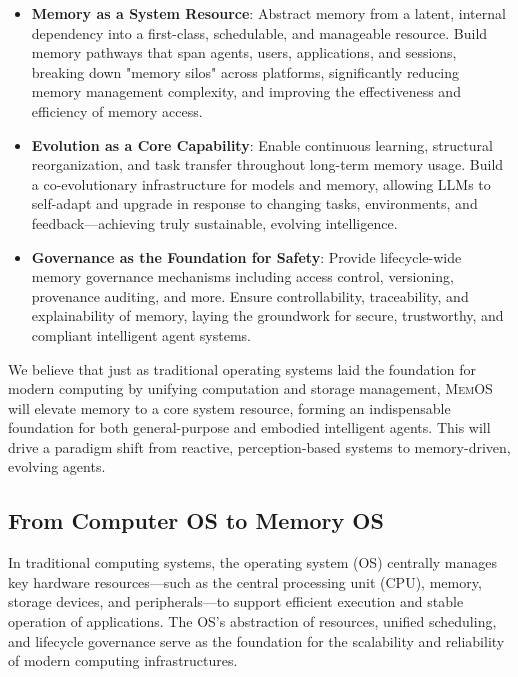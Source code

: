 \documentclass[]{memtensor}
\begin{document}
\begin{itemize}
    \item \textbf{Memory as a System Resource}: Abstract memory from a latent, internal dependency into a first-class, schedulable, and manageable resource. Build memory pathways that span agents, users, applications, and sessions, breaking down "memory silos" across platforms, significantly reducing memory management complexity, and improving the effectiveness and efficiency of memory access.

    \item \textbf{Evolution as a Core Capability}: Enable continuous learning, structural reorganization, and task transfer throughout long-term memory usage. Build a co-evolutionary infrastructure for models and memory, allowing LLMs to self-adapt and upgrade in response to changing tasks, environments, and feedback—achieving truly sustainable, evolving intelligence.

    \item \textbf{Governance as the Foundation for Safety}: Provide lifecycle-wide memory governance mechanisms including access control, versioning, provenance auditing, and more. Ensure controllability, traceability, and explainability of memory, laying the groundwork for secure, trustworthy, and compliant intelligent agent systems.
\end{itemize}

We believe that just as traditional operating systems laid the foundation for modern computing by unifying computation and storage management, \textsc{MemOS} will elevate memory to a core system resource, forming an indispensable foundation for both general-purpose and embodied intelligent agents. This will drive a paradigm shift from reactive, perception-based systems to memory-driven, evolving agents.

\subsection{From Computer OS to Memory OS}

In traditional computing systems, the operating system (OS) centrally manages key hardware resources—such as the central processing unit (CPU), memory, storage devices, and peripherals—to support efficient execution and stable operation of applications. The OS’s abstraction of resources, unified scheduling, and lifecycle governance serve as the foundation for the scalability and reliability of modern computing infrastructures.
\end{document}
